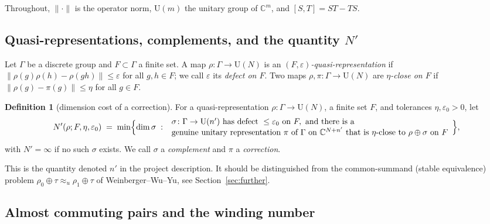 \documentclass[11pt]{amsart}
\theoremstyle{definition}
\newtheorem{definition}[theorem]{Definition}
\theoremstyle{remark}
\newcommand{\C}{\mathbb C}
\newcommand{\U}{\mathrm U}
\newcommand{\norm}[1]{\lVert #1\rVert}
\begin{document}
Throughout, $\norm{\cdot}$ is the operator norm, $\U(m)$ the unitary group of $\C^m$, and $[S,T]=ST-TS$.

\subsection{Quasi-representations, complements, and the quantity $N'$}

Let $\Gamma$ be a discrete group and $F\subset\Gamma$ a finite set. A map $\rho\colon\Gamma\to\U(N)$ is an \emph{$(F,\varepsilon)$-quasi-representation} if $\norm{\rho(g)\rho(h)-\rho(gh)}\le\varepsilon$ for all $g,h\in F$; we call $\varepsilon$ its \emph{defect on $F$}. Two maps $\rho,\pi\colon\Gamma\to\U(N)$ are \emph{$\eta$-close on $F$} if $\norm{\rho(g)-\pi(g)}\le\eta$ for all $g\in F$.

\begin{definition}[dimension cost of a correction]\label{def:Nprime}
For a quasi-representation $\rho\colon\Gamma\to\U(N)$, a finite set $F$, and tolerances $\eta,\varepsilon_0>0$, let
\[
N'(\rho;F,\eta,\varepsilon_0)\;=\;\min\Bigl\{\dim\sigma\;:\;
\begin{array}{l}\sigma\colon\Gamma\to\U(n')\text{ has defect }\le\varepsilon_0\text{ on }F,\text{ and there is a}\\ \text{genuine unitary representation }\pi\text{ of }\Gamma\text{ on }\C^{N+n'}\text{ that is }\eta\text{-close to }\rho\oplus\sigma\text{ on }F\end{array}\Bigr\},
\]
with $N'=\infty$ if no such $\sigma$ exists. We call $\sigma$ a \emph{complement} and $\pi$ a \emph{correction}.
\end{definition}

This is the quantity denoted $n'$ in the project description. It should be distinguished from the common-summand (stable equivalence) problem $\rho_0\oplus\tau\approx_u\rho_1\oplus\tau$ of Weinberger--Wu--Yu, see Section~\ref{sec:further}.

\subsection{Almost commuting pairs and the winding number}
\end{document}
